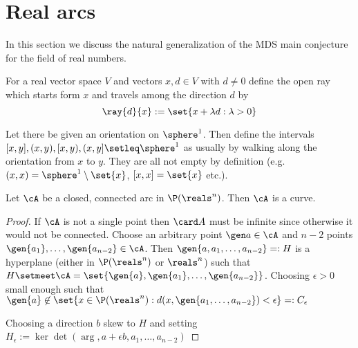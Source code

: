 \section{Real arcs}

In this section we discuss the natural generalization of the MDS main conjecture for the field of real numbers.

\begin{definition}
    For a real vector space $V$ and vectors $x, d\in V$ with $d\neq 0$ define the open ray which starts form $x$ and travels among the direction $d$ by
    $$
    \ray{d}{x}:=\set{x+\lambda d:\lambda>0}
    $$
\end{definition}

\begin{definition}
    Let there be given an orientation on $\sphere^1$. Then define the intervals $[x,y],(x,y),[x,y),(x,y]\setleq \sphere^1$ as usually
    by walking along the orientation from $x$ to $y$. They are all not empty by definition (e.g. $(x,x)=\sphere^1\setminus\set{x}$, $[x,x]=\set{x}$ etc.).
\end{definition}


\begin{theorem}[Me]
    Let $\cA$ be a closed, connected arc in $\P(\reals^n)$. Then $\cA$ is a curve.
\end{theorem}

\begin{proof}
    If $\cA$ is not a single point then $\card A$ must be infinite since otherwise it would not be connected. Choose an arbitrary point $\gen a\in\cA$ and $n-2$ points $\gen{a_1},\ldots,\gen{a_{n-2}}\in\cA$. Then $\gen{a,a_1,\ldots,a_{n-2}}=:H$ is a hyperplane (either in $\P(\reals^n)$ or $\reals^n$) such that $H\setmeet\cA=\set{\gen{a},\gen{a_1},\ldots,\gen{a_{n-2}}}$. Choosing $\epsilon>0$ small enough such that $\gen{a}\not\in\set{x\in\P(\reals^n):d(x,\gen{a_1,\ldots,a_{n-2}})<\epsilon}=:C_{\epsilon}$

    Choosing a direction $b$ skew to $H$ and setting $H_{\epsilon}:=\ker\det(\arg,a+\epsilon b,a_1,\ldots,a_{n-2})$
\end{proof}

